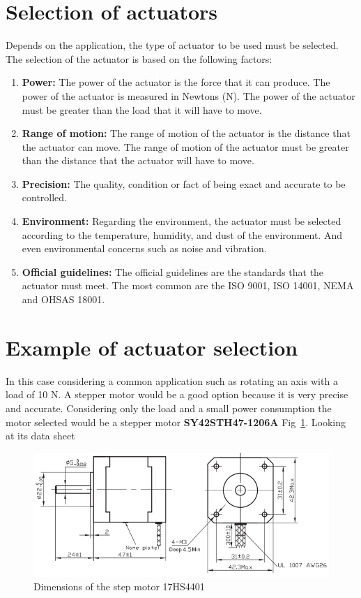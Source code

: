 \documentclass[runningheads]{llncs}
\begin{document}
\section{Selection of actuators}

Depends on the application, the type of actuator to be used must be selected. The selection of the actuator is based on the following factors\cite{hines2017soft}:
\begin{enumerate}
    \item \textbf{Power:} The power of the actuator is the force that it can produce. The power of the actuator is measured in Newtons (N). The power of the actuator must be greater than the load that it will have to move.
    \item \textbf{Range of motion: } The range of motion of the actuator is the distance that the actuator can move. The range of motion of the actuator must be greater than the distance that the actuator will have to move.
    \item \textbf{Precision: } The quality, condition or fact of being exact and accurate to be controlled.
    \item \textbf{Environment: } Regarding the environment, the actuator must be selected according to the temperature, humidity, and dust of the environment. And even environmental concerns such as noise and vibration. 
    \item \textbf{Official guidelines: } The official guidelines are the standards that the actuator must meet. The most common are the ISO 9001, ISO 14001, NEMA and OHSAS 18001.
\end{enumerate}

\section{Example of actuator selection}

In this case considering a common application such as rotating an axis with a load of 10 N.
A stepper motor would be a good option because it is very precise and accurate. Considering only the load and a small power consumption the motor selected would be a stepper motor \textbf{SY42STH47-1206A} Fig~\ref{fig:StepMotorDiagram}. 
Looking at its data sheet 

\begin{figure}[!h]
    \centering
    \caption{Dimensions of the step motor 17HS4401}\label{fig:StepMotorDiagram}
    \includegraphics[scale = 0.7]{StepIsometric.png}
\end{figure}
\end{document}
